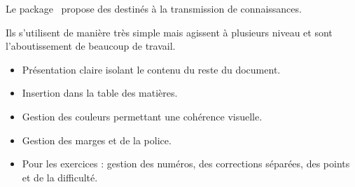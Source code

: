 \begin{MultiColonnes}{2}
    \tcbitem Le package \bfcours\ propose des  destinés à la transmission de connaissances. 

    Ils s'utilisent de manière très simple mais agissent à plusieurs niveau et sont l'aboutissement de beaucoup de travail.
    \tcbitem \begin{itemize}[label=$\bullet$]
    \item Présentation claire isolant le contenu du reste du document. 
    \item Insertion dans la table des matières. 
    \item Gestion des couleurs permettant une cohérence visuelle.
    \item Gestion des marges et de la police.
    \item Pour les exercices : gestion des numéros, des corrections séparées, des points et de la difficulté.
\end{itemize}
\end{MultiColonnes}
